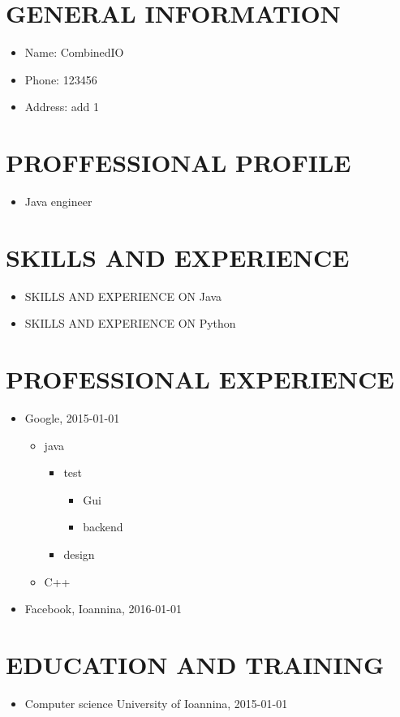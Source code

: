 \documentclass{article}
\begin{document}
 
\section{GENERAL INFORMATION}
\begin{itemize}
\item Name: CombinedIO
\item Phone: 123456
\item Address: add 1
\end{itemize}
\section{PROFFESSIONAL PROFILE}
\begin{itemize}
\item Java engineer
\end{itemize}
\section{SKILLS AND EXPERIENCE}
\begin{itemize}
\item SKILLS AND EXPERIENCE ON Java
\item SKILLS AND EXPERIENCE ON Python
\end{itemize}
\section{PROFESSIONAL EXPERIENCE}
\begin{itemize}
\item Google, 2015-01-01
\begin{itemize}
\item java
\begin{itemize}
\item test
\begin{itemize}
\item Gui
\item backend
\end{itemize}
\item design
\end{itemize}
\item C++
\end{itemize}
\item Facebook, Ioannina, 2016-01-01
\end{itemize}
\section{EDUCATION AND TRAINING}
\begin{itemize}
\item Computer science University of Ioannina, 2015-01-01
\end{itemize}
\end{document}
